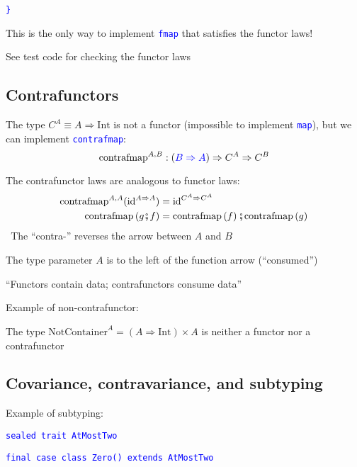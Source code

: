 \texttt{\textcolor{blue}{\footnotesize{}\}}}{\footnotesize\par}

This is the only way to implement \texttt{\textcolor{blue}{\footnotesize{}fmap}}
that satisfies the functor laws!

See test code for checking the functor laws


\subsection{Contrafunctors}

The type  $C^{A}\equiv A\Rightarrow\text{Int}$ is not a functor (impossible
to implement \texttt{\textcolor{blue}{\footnotesize{}map}}), but we
can implement \texttt{\textcolor{blue}{\footnotesize{}contrafmap}}:
\[
\text{contrafmap}^{A,B}:\left({\color{blue}B\Rightarrow A}\right)\Rightarrow C^{A}\Rightarrow C^{B}
\]

The contrafunctor laws are analogous to functor laws:\texttt{\textcolor{blue}{\footnotesize{}
\begin{align*}
\text{contrafmap}^{A,A}(\text{id}^{A\Rightarrow A}) & =\text{id}^{C^{A}\Rightarrow C^{A}}\\
\text{contrafmap}\left(g\bef f\right) & =\text{contrafmap}\left(f\right)\bef\text{contrafmap}\left(g\right)
\end{align*}
}}The ``contra-'' reverses the arrow between $A$ and $B$

The type parameter $A$ is to the left of the function arrow (``consumed'')

``Functors contain data; contrafunctors consume data''

Example of non-contrafunctor:

The type $\text{NotContainer}^{A}=\left(A\Rightarrow\text{Int}\right)\times A$
is neither a functor nor a contrafunctor


\subsection{Covariance, contravariance, and subtyping}

Example of subtyping:

\texttt{\textcolor{blue}{\footnotesize{}sealed trait AtMostTwo}}{\footnotesize\par}

\texttt{\textcolor{blue}{\footnotesize{}final case class Zero() extends
AtMostTwo}}{\footnotesize\par}


